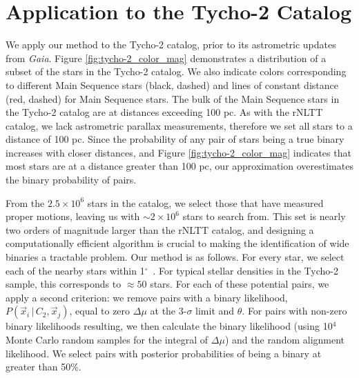 \documentclass[usenatbib]{mnras}
\newcommand{\given}{\,|\,}
\newcommand{\degree}{\ifmmode {^\circ}\else$^\circ$\ \fi}
\begin{document}




\section{Application to the Tycho-2 Catalog}

We apply our method to the Tycho-2 catalog, prior to its astrometric updates from {\it Gaia}. Figure \ref{fig:tycho-2_color_mag} demonstrates a distribution of a subset of the stars in the Tycho-2 catalog. We also indicate colors corresponding to different Main Sequence stars (black, dashed) and lines of constant distance (red, dashed) for Main Sequence stars. The bulk of the Main Sequence stars in the Tycho-2 catalog are at distances exceeding 100 pc. As with the rNLTT catalog, we lack astrometric parallax measurements, therefore we set all stars to a distance of 100 pc. Since the probability of any pair of stars being a true binary increases with closer distances, and Figure \ref{fig:tycho-2_color_mag} indicates that most stars are at a distance greater than 100 pc, our approximation overestimates the binary probability of pairs.


From the $2.5\times10^6$ stars in the catalog, we select those that have measured proper motions, leaving us with $\sim2\times10^6$ stars to search from. This set is nearly two orders of magnitude larger than the rNLTT catalog, and designing a computationally efficient algorithm is crucial to making the identification of wide binaries a tractable problem. Our method is as follows. For every star, we select each of the nearby stars within 1\degree. For typical stellar densities in the Tycho-2 sample, this corresponds to $\approx50$ stars. For each of these potential pairs, we apply a second criterion: we remove pairs with a binary likelihood, $P(\vec{x}_i \given C_2, \vec{x}_j)$, equal to zero $\Delta \mu$ at the 3-$\sigma$ limit and $\theta$. For pairs with non-zero binary likelihoods resulting, we then calculate the binary likelihood (using 10$^4$ Monte Carlo random samples for the integral of $\Delta \mu$) and the random alignment likelihood. We select pairs with posterior probabilities of being a binary at greater than 50\%.
 
\end{document}
